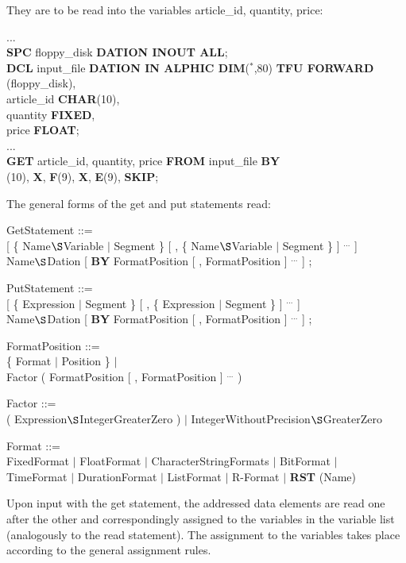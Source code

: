 \begin{enumerate}
They are to be read into the variables article\_id, quantity, price:

...\\
{\bf SPC} floppy\_disk {\bf DATION INOUT ALL};\\
{\bf DCL} input\_file {\bf DATION IN ALPHIC DIM}($^*$,80) {\bf TFU FORWARD}\\
\x {} (floppy\_disk),\\
\x article\_id {\bf CHAR}(10),\\
\x quantity {\bf FIXED},\\
\x price {\bf FLOAT};\\
...\\
{\bf GET} article\_id, quantity, price {\bf FROM} input\_file {\bf BY}\\
(10), {\bf X}, {\bf F}(9), {\bf X}, {\bf E}(9), {\bf SKIP};
\end{enumerate}

The general forms of the get and put statements read:

GetStatement ::=\\
 [ \{ Name$\S $Variable $\mid$ Segment \} [ , \{ Name$\S $Variable $\mid$ Segment \} ] $^{...}$ ]\\
 Name$\S $Dation [ {\bf BY} FormatPosition [ , FormatPosition ] $^{...}$ ] ;

PutStatement ::=\\
 [ \{ Expression $\mid$ Segment \} [ , \{ Expression $\mid$ Segment \} ] $^{...}$ ]\\
 Name$\S $Dation [ {\bf BY} FormatPosition [ , FormatPosition ] $^{...}$ ] ;

FormatPosition ::=\\
\x [ Factor ] \{ Format $\mid$ Position \} $\mid$\\
\x Factor ( FormatPosition [ , FormatPosition ] $^{...}$ )

Factor ::=\\
\x ( Expression$\S $IntegerGreaterZero ) $\mid$ IntegerWithoutPrecision$\S $GreaterZero

Format ::=\\
\x FixedFormat $\mid$ FloatFormat $\mid$ CharacterStringFormats $\mid$ BitFormat $\mid$\\
\x TimeFormat $\mid$ DurationFormat $\mid$ ListFormat $\mid$ R-Format $\mid$ {\bf RST} (Name)

Upon input with the get statement, the addressed data elements are
read one after the other and correspondingly assigned to the variables
in the variable list (analogously to the read statement). The
assignment to the variables takes place according to the general
assignment rules.


